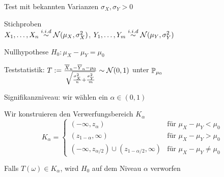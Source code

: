 \begin{definition}[ungepaart] Test mit bekannten Varianzen \(\sigma_X, \sigma_Y > 0\)

	\begin{compactenum}
		\item Stichproben \\
		\(X_1, \ldots, X_n \iid \Stdev(\mu_X,\sigma_X^2)\),\quad
		\(Y_1, \ldots, Y_m \iid \Stdev(\mu_Y,\sigma_Y^2)\)
		\item Nullhypothese \(H_0: \mu_X - \mu_Y = \mu_0\)
		\item Teststatistik: \( T := \frac{ \overline{X}_n - \overline{Y}_n - \mu_0 }
		{\sqrt{ \frac{\sigma_X^2}{n} + \frac{\sigma_Y^2}{m} }} \sim \Stdev(0,1)\) unter \(\P_{\mu_0}\)
		\item Signifikanzniveau: wir wählen ein \(\alpha \in (0,1)\)
		\item Wir konstruieren den Verwerfungsbereich \(K_\alpha\)
		\[
			K_\alpha
			=	\left\{\begin{array}{cl}
				(-\infty, z_{\alpha})                                 & \text{für } \mu_X - \mu_Y < \mu_0    \\
				(z_{1-\alpha}, \infty)                                & \text{für } \mu_X - \mu_Y > \mu_0    \\
				(-\infty, z_{\alpha/2}) \cup (z_{1-\alpha/2}, \infty) & \text{für } \mu_X - \mu_Y \neq \mu_0
			\end{array}\right.
		\]
		\item Falls \(T(\omega) \in K_\alpha\), wird \(H_0\) auf dem Niveau \(\alpha\) verworfen
	\end{compactenum}
\end{definition}


